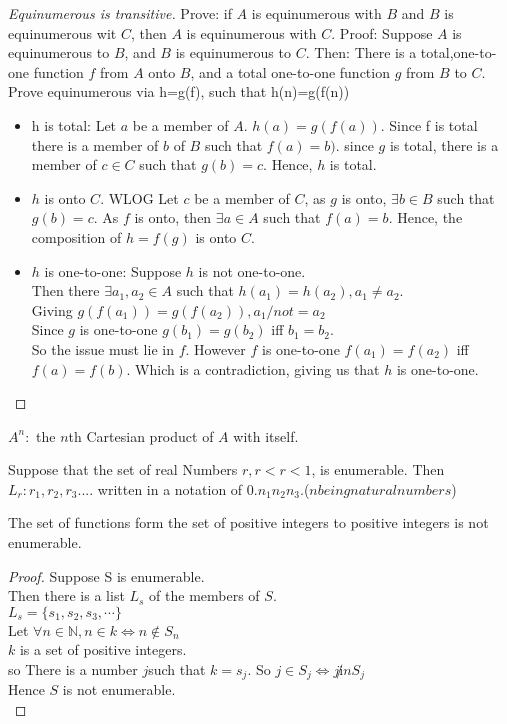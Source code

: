 \begin{proof}[Equinumerous is transitive]
Prove: if $A$ is equinumerous with $B$ and $B$ is equinumerous wit $C$, then $A$ is equinumerous with $C$.
Proof: Suppose $A$ is equinumerous to $B$, and $B$ is equinumerous to $C$. Then:
There is a total,one-to-one function $f$ from $A$ onto $B$, and a total one-to-one function $g$ from $B$ to $C$.
Prove equinumerous via h=g(f), such that h(n)=g(f(n))
\begin{itemize}
\item h is total: Let $a$ be a member of $A$. $h(a) = g(f(a))$. Since f is total there is a member of $b$ of $B$ such that $f(a)=b)$. since $g$ is total, there is a member of $c \in C$ such that $g(b)=c$. Hence, $h$ is total.
\item $h$ is onto $C$. WLOG Let $c$ be a member of $C$, as $g$ is onto, $\exists b \in B$ such that $g(b)=c$. As $f$ is onto, then $\exists a \in A $ such that $f(a)=b$. Hence, the composition of $h=f(g)$ is onto $C$.
\item $h$ is one-to-one: Suppose $h$ is not one-to-one. \\
Then there $\exists a_1,a_2 \in A$ such that $h(a_1)=h(a_2), a_1 \not = a_2$.\\
Giving $g(f(a_1))=g(f(a_2)), a_1 /not = a_2$\\
Since $g$ is one-to-one $g(b_1) = g(b_2)$ iff $b_1=b_2$. \\
So the issue must lie in $f$.  However $f$ is one-to-one $f(a_1) = f(a_2)$ iff $f(a) = f(b)$.
Which is a contradiction, giving us that $h$ is one-to-one.
\end{itemize}
\end{proof}



$A^{n}:$ the $n$th Cartesian product of $A$ with itself.


Suppose that the set of real Numbers $r, r \lt r \lt 1$, is enumerable.
Then $L_r : r_1,r_2,r_3....$ written in a notation of  $0.n_1 n_2 n_3$.($n being natural numbers$)

The set of functions form the set of positive integers to positive integers is not enumerable.
\begin{proof}
Suppose S is enumerable.\\
Then there is a list $L_s$ of the members of $S$.\\
$L_s = \{ s_1,s_2,s_3,\cdots \}$\\
Let $\forall n \in \mathbb{N}, n \in k \iff n \not \in S_n$\\
$k$ is a set of positive integers. \\
so There is a number $j$such that $k=s_j$.
So $j \in S_j \iff j \not in S_j$ \\
Hence $S$ is not enumerable. \\
\end{proof}

